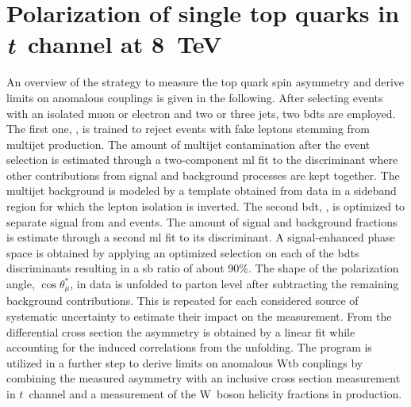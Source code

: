 \chapter{Polarization of single top quarks in \textsl{t}~channel at 8~TeV}


An overview of the strategy to measure the top quark spin asymmetry and derive limits on anomalous couplings is given in the following. After selecting events with an isolated muon or electron and two or three jets, two \glspl{bdt} are employed. The first one, \bdtqcd, is trained to reject events with fake leptons stemming from multijet production. The amount of multijet contamination after the event selection is estimated through a two-component \gls{ml} fit to the \bdtqcd discriminant where other contributions from signal and background processes are kept together. The multijet background is modeled by a template obtained from data in a sideband region for which the lepton isolation is inverted. The second \gls{bdt}, \bdttch, is optimized to separate signal from \wjets and \ttbar events. The amount of signal and background fractions is estimate through a second \gls{ml} fit to its discriminant. A signal-enhanced phase space is obtained by applying an optimized selection on each of the \glspl{bdt} discriminants resulting in a \gls{sb} ratio of about 90\%. The shape of the polarization angle, $\cos\theta^{*}_{\mu}$, in data is unfolded to parton level after subtracting the remaining background contributions. This is repeated for each considered source of systematic uncertainty to estimate their impact on the measurement. From the differential cross section the asymmetry is obtained by a linear fit while accounting for the induced correlations from the unfolding. The \TOPFIT program is utilized in a further step to derive limits on anomalous Wtb couplings by combining the measured asymmetry with an inclusive cross section measurement in $t$~channel and a measurement of the W~boson helicity fractions in \ttbar production.





